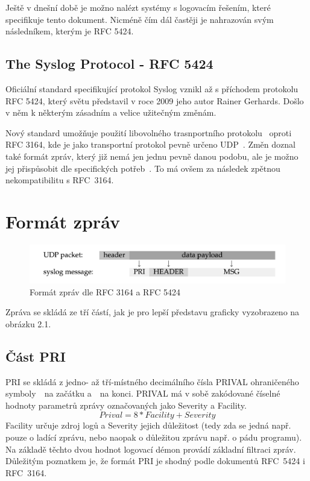 \documentclass[thesis=B,czech]{FITthesis}[2012/06/26]
\begin{document}
Ještě v dnešní době je možno nalézt systémy s logovacím řešením, které specifikuje tento dokument. Nicméně čím dál častěji je nahrazován svým následníkem, kterým je RFC 5424.

\subsection{The Syslog Protocol - RFC 5424}
Oficiální standard specifikující protokol Syslog vznikl až s příchodem protokolu RFC 5424, který světu představil v roce 2009 jeho autor Rainer Gerhards. Došlo v něm k některým zásadním a velice užitečným změnám.

Nový standard umožňuje použití libovolného trasnportního protokolu~\cite{RFC5424-TrProt} oproti RFC 3164, kde je jako transportní protokol pevně určeno UDP~\cite{RFC3164-UDP}.
Změn doznal také formát zpráv, který již nemá jen jednu pevně danou podobu, ale je možno jej přispůsobit dle specifických potřeb~\cite{RFC5424-MsgForm}. To má ovšem za následek zpětnou nekompatibilitu s RFC~3164.

\section{Formát zpráv}
\begin{figure}[H]
	\centering
	\includegraphics[scale=0.3]{images/syslog-message-format}
	\caption[Formát zpráv dle RFC 3164 a RFC 5424]{Formát zpráv dle RFC 3164 a RFC 5424}
\end{figure}

Zpráva se skládá ze tří částí, jak je pro lepší představu graficky vyzobrazeno na obrázku 2.1.

\subsection{Část PRI}
PRI se skládá z jedno- až tří-místného decimálního čísla PRIVAL ohraničeného symboly~\uv{<}~na začátku a~\uv{>}~na konci.
PRIVAL má v sobě zakódované číselné hodnoty parametrů zprávy označovaných jako Severity a Facility.
$$Prival= 8*Facility+Severity$$
Facility určuje zdroj logů a Severity jejich důležitost (tedy zda se jedná např. pouze o ladící zprávu, nebo naopak o důležitou zprávu např. o pádu programu).
\clearpage
Na základě těchto dvou hodnot logovací démon provádí základní filtraci zpráv.
Důležitým poznatkem je, že formát PRI je shodný podle dokumentů RFC~5424 i RFC~3164.
\end{document}
